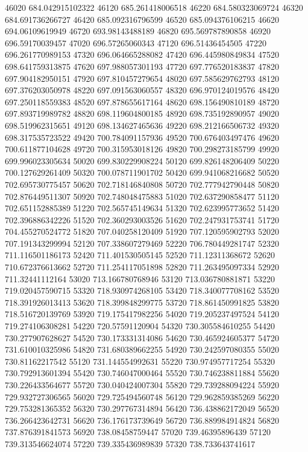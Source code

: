 {46020 684.042915102322
46120 685.261418006518
46220 684.580323069724
46320 684.691736266727
46420 685.092316796599
46520 685.094376106215
46620 694.06109619949
46720 693.98143488189
46820 695.569787890858
46920 696.59170039457
47020 696.57265060343
47120 696.51436454505
47220 696.261770989153
47320 696.064665288082
47420 696.445980849834
47520 698.641759313875
47620 697.988057301193
47720 697.776520183837
47820 697.904182950151
47920 697.810457279654
48020 697.585629762793
48120 697.376203050978
48220 697.091563060557
48320 696.970124019576
48420 697.250118559383
48520 697.878655617164
48620 698.156490810189
48720 697.893719989782
48820 698.119604800185
48920 698.735192890957
49020 698.519962315651
49120 698.134627465636
49220 698.212166506732
49320 698.317535723522
49420 700.784091157936
49520 700.676403497476
49620 700.611877104628
49720 700.315953018126
49820 700.298273185799
49920 699.996023305634
50020 699.830229908224
50120 699.826148206409
50220 700.127629261409
50320 700.078711901702
50420 699.941068216682
50520 702.695730775457
50620 702.718146840808
50720 702.777942790448
50820 702.876449511307
50920 702.748048475883
51020 702.637290858477
51120 702.651152885389
51220 702.565745149634
51320 702.623995773652
51420 702.396886342226
51520 702.360293003526
51620 702.247931753741
51720 704.455270524772
51820 707.040258120409
51920 707.120595902793
52020 707.191343299994
52120 707.338607279469
52220 706.780449281747
52320 711.116501186173
52420 711.401530505145
52520 711.12311368672
52620 710.672376613662
52720 711.254117051898
52820 711.263495097334
52920 711.32441112164
53020 713.166780768946
53120 713.036780881871
53220 719.020457590715
53320 718.930974268105
53420 718.340077708162
53520 718.391926013413
53620 718.399848299775
53720 718.861450991825
53820 718.516720139769
53920 719.175417982256
54020 719.205237497524
54120 719.274106308281
54220 720.57591120904
54320 730.305584610255
54420 730.277907628627
54520 730.173331314086
54620 730.465924605377
54720 731.610010325986
54820 731.680389662255
54920 730.242597080355
55020 730.81162217542
55120 731.144554992631
55220 730.974957717254
55320 730.792913601394
55420 730.746047000464
55520 730.746238811884
55620 730.226433564677
55720 730.040424007304
55820 729.739288094224
55920 729.932727306565
56020 729.725494560748
56120 729.962859385269
56220 729.753281365352
56320 730.297767314894
56420 736.438862172049
56520 736.266423642731
56620 736.176173739649
56720 736.889984914824
56820 737.876391841573
56920 738.08458759447
57020 739.46395896439
57120 739.313546624074
57220 739.335436989839
57320 738.733643741617
}

